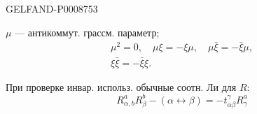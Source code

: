 \begin{GelfandAdjacentEvidence}{GELFAND-P000875}{3}


$\mu$ --- антикоммут. грассм. параметр;
\begin{equation*}
\begin{gathered}
\mu^2=0,\quad\mu\xi=-\xi\mu,\quad\mu\bar\xi=-\bar\xi\mu,\\
\xi\bar\xi=-\bar\xi\xi.
\end{gathered}
\tag{44}
\end{equation*}

При проверке инвар. использ. обычные соотн. Ли для $R$:
\begin{equation*}
R_{\alpha,b}^aR_\beta^b-(\alpha\leftrightarrow\beta)=-t^\gamma_{\alpha\beta}R_\gamma^a
\tag{45}
\end{equation*}
\end{GelfandAdjacentEvidence}



